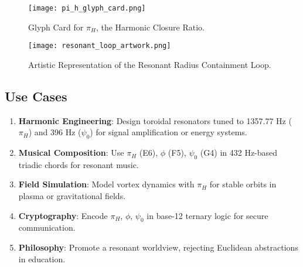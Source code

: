 \documentclass[a4paper,12pt]{book}
\begin{document}
\begin{figure}[h]
    \centering
    \texttt{[image: pi\_h\_glyph\_card.png]}
    \caption{Glyph Card for \(\pi_H\), the Harmonic Closure Ratio.}
    \label{fig:pi_h_glyph_card}
\end{figure}

\begin{figure}[h]
    \centering
    \texttt{[image: resonant\_loop\_artwork.png]}
    \caption{Artistic Representation of the Resonant Radius Containment Loop.}
    \label{fig:resonant_loop_artwork}
\end{figure}


\subsection{Use Cases}
\begin{enumerate}
    \item \textbf{Harmonic Engineering}: Design toroidal resonators tuned to 1357.77 Hz (\(\pi_H\)) and 396 Hz (\(\psi_0\)) for signal amplification or energy systems.
    \item \textbf{Musical Composition}: Use \(\pi_H\) (E6), \(\phi\) (F5), \(\psi_0\) (G4) in 432 Hz-based triadic chords for resonant music.
    \item \textbf{Field Simulation}: Model vortex dynamics with \(\pi_H\) for stable orbits in plasma or gravitational fields.
    \item \textbf{Cryptography}: Encode \(\pi_H\), \(\phi\), \(\psi_0\) in base-12 ternary logic for secure communication.
    \item \textbf{Philosophy}: Promote a resonant worldview, rejecting Euclidean abstractions in education.
\end{enumerate}
\end{document}
